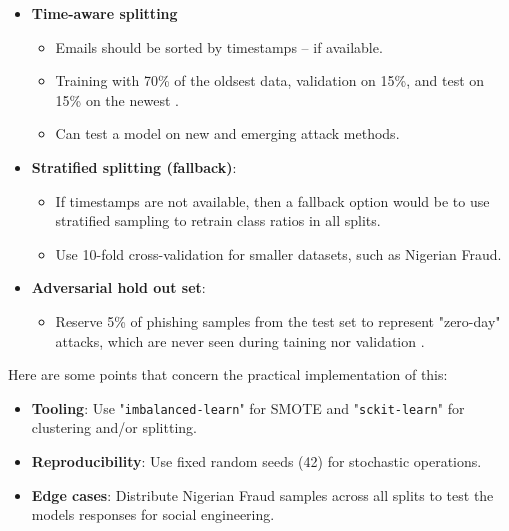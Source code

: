 \begin{itemize}
  \item \textbf{Time-aware splitting}
  \begin{itemize}
    \item Emails should be sorted by timestamps -- if available.
    \item Training with 70\% of the oldsest data, validation on 15\%, and test on 15\% on the newest \citep{kapoor2024comparative}.
    \item Can test a model on new and emerging attack methods.
  \end{itemize}
  \item \textbf{Stratified splitting (fallback)}:
  \begin{itemize}
    \item If timestamps are not available, then a fallback option would be to use stratified sampling to retrain class ratios in all splits.
    \item Use 10-fold cross-validation for smaller datasets, such as Nigerian Fraud.
  \end{itemize}
  \item \textbf{Adversarial hold out set}:
  \begin{itemize}
    \item Reserve 5\% of phishing samples from the test set to represent "zero-day" attacks, which are never seen during taining nor validation \citep{atlam2022business}.
  \end{itemize}
\end{itemize}

\noindent Here are some points that concern the practical implementation of this:

\begin{itemize}
  \item \textbf{Tooling}: Use "\texttt{imbalanced-learn}" for SMOTE and "\texttt{sckit-learn}" for clustering and/or splitting.
  \item \textbf{Reproducibility}: Use fixed random seeds (42) for stochastic operations.
  \item \textbf{Edge cases}: Distribute Nigerian Fraud samples across all splits to test the models responses for social engineering.
\end{itemize}
